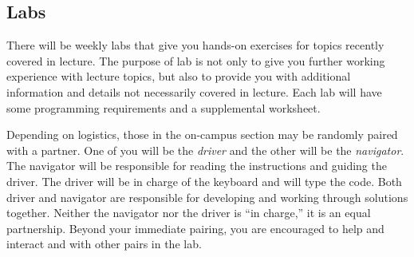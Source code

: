 \documentclass[12pt]{scrartcl}
\begin{document}
%

%

\subsection{Labs}

There will be weekly labs that give you hands-on exercises for 
topics recently covered in lecture.  The purpose of lab is not 
only to give you further working experience with lecture topics, 
but also to provide you with additional information and details 
not necessarily covered in lecture.  Each lab will have some 
programming requirements and a supplemental worksheet.  

Depending on logistics, those in the on-campus section may be
randomly paired with a partner.  One of you will 
be the \emph{driver} and the other will be the \emph{navigator}.  
The navigator will be responsible for reading the instructions 
and guiding the driver.  The driver will be in charge of the 
keyboard and will type the code.  Both driver and navigator are 
responsible for developing and working through solutions together.
Neither the navigator nor the driver is ``in charge,'' it is an 
equal partnership.  Beyond your immediate pairing, you are 
encouraged to help and interact and with other pairs in the lab.
\end{document}
